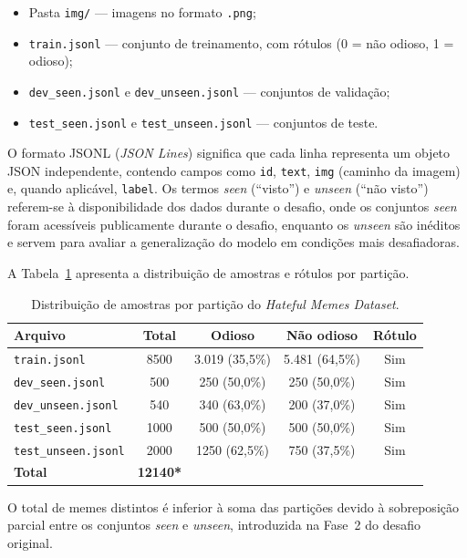 \begin{itemize}
    \item Pasta \texttt{img/} --- imagens no formato \texttt{.png};
    \item \texttt{train.jsonl} --- conjunto de treinamento, com rótulos (0 = não odioso, 1 = odioso);
    \item \texttt{dev\_seen.jsonl} e \texttt{dev\_unseen.jsonl} --- conjuntos de validação;
    \item \texttt{test\_seen.jsonl} e \texttt{test\_unseen.jsonl} --- conjuntos de teste.
\end{itemize}

O formato JSONL (\textit{JSON Lines}) significa que cada linha representa um objeto JSON independente, contendo campos como \texttt{id}, \texttt{text}, \texttt{img} (caminho da imagem) e, quando aplicável, \texttt{label}. Os termos \textit{seen} (``visto'') e \textit{unseen} (``não visto'') referem-se à disponibilidade dos dados durante o desafio, onde os conjuntos \textit{seen} foram acessíveis publicamente durante o desafio, enquanto os \textit{unseen} são inéditos e servem para avaliar a generalização do modelo em condições mais desafiadoras.

A Tabela~\ref{tab:dataset-splits} apresenta a distribuição de amostras e rótulos por partição.

\begin{table}[ht]
\centering
\caption{Distribuição de amostras por partição do \textit{Hateful Memes Dataset}.}
\label{tab:dataset-splits}
\begin{tabular}{lcccc}
\hline
\textbf{Arquivo} & \textbf{Total} & \textbf{Odioso} & \textbf{Não odioso} & \textbf{Rótulo} \\
\hline
\texttt{train.jsonl}        & 8500 & 3.019 (35,5\%) & 5.481 (64,5\%) & Sim \\
\texttt{dev\_seen.jsonl}    &   500 &   250 (50,0\%) &   250 (50,0\%) & Sim \\
\texttt{dev\_unseen.jsonl}  &   540 &   340 (63,0\%) &   200 (37,0\%) & Sim \\
\texttt{test\_seen.jsonl}   & 1000 &   500 (50,0\%) &   500 (50,0\%) & Sim \\
\texttt{test\_unseen.jsonl} & 2000 &   1250 (62,5\%) & 750 (37,5\%) & Sim \\
\hline
\textbf{Total}              & \textbf{12140*} & & & \\
\hline
\end{tabular}
\par\vspace{2pt}
{\footnotesize *O total de memes distintos é inferior à soma das partições devido à 
sobreposição parcial entre os conjuntos \textit{seen} e \textit{unseen}, introduzida na 
Fase~2 do desafio original.}
\end{table}

